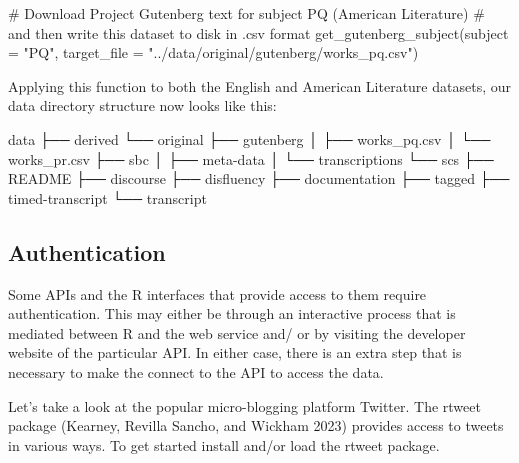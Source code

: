 \documentclass[
  letterpaper,
]{latex/krantz}
\newenvironment{Shaded}{\begin{snugshade}}{\end{snugshade}}
\newcommand{\AttributeTok}[1]{\textcolor[rgb]{0.40,0.45,0.13}{#1}}
\newcommand{\CommentTok}[1]{\textcolor[rgb]{0.37,0.37,0.37}{#1}}
\newcommand{\ExtensionTok}[1]{\textcolor[rgb]{0.00,0.23,0.31}{#1}}
\newcommand{\FunctionTok}[1]{\textcolor[rgb]{0.28,0.35,0.67}{#1}}
\newcommand{\NormalTok}[1]{\textcolor[rgb]{0.00,0.23,0.31}{#1}}
\newcommand{\StringTok}[1]{\textcolor[rgb]{0.13,0.47,0.30}{#1}}
\begin{document}
\begin{Shaded}
\begin{Highlighting}[]
\CommentTok{\# Download Project Gutenberg text for subject \textquotesingle{}PQ\textquotesingle{} (American Literature)}
\CommentTok{\# and then write this dataset to disk in .csv format}
\FunctionTok{get\_gutenberg\_subject}\NormalTok{(}\AttributeTok{subject =} \StringTok{"PQ"}\NormalTok{, }\AttributeTok{target\_file =} \StringTok{"../data/original/gutenberg/works\_pq.csv"}\NormalTok{)}
\end{Highlighting}
\end{Shaded}

Applying this function to both the English and American Literature
datasets, our data directory structure now looks like this:

\begin{Shaded}
\begin{Highlighting}[]
\ExtensionTok{data}
\ExtensionTok{├──}\NormalTok{ derived}
\ExtensionTok{└──}\NormalTok{ original}
    \ExtensionTok{├──}\NormalTok{ gutenberg}
    \ExtensionTok{│}\NormalTok{   ├── works\_pq.csv}
    \ExtensionTok{│}\NormalTok{   └── works\_pr.csv}
    \ExtensionTok{├──}\NormalTok{ sbc}
    \ExtensionTok{│}\NormalTok{   ├── meta{-}data}
    \ExtensionTok{│}\NormalTok{   └── transcriptions}
    \ExtensionTok{└──}\NormalTok{ scs}
        \ExtensionTok{├──}\NormalTok{ README}
        \ExtensionTok{├──}\NormalTok{ discourse}
        \ExtensionTok{├──}\NormalTok{ disfluency}
        \ExtensionTok{├──}\NormalTok{ documentation}
        \ExtensionTok{├──}\NormalTok{ tagged}
        \ExtensionTok{├──}\NormalTok{ timed{-}transcript}
        \ExtensionTok{└──}\NormalTok{ transcript}
\end{Highlighting}
\end{Shaded}

\hypertarget{authentication}{%
\subsection{Authentication}\label{authentication}}

Some APIs and the R interfaces that provide access to them require
authentication. This may either be through an interactive process that
is mediated between R and the web service and/ or by visiting the
developer website of the particular API. In either case, there is an
extra step that is necessary to make the connect to the API to access
the data.

Let's take a look at the popular micro-blogging platform Twitter. The
rtweet package (Kearney, Revilla Sancho, and Wickham 2023) provides
access to tweets in various ways. To get started install and/or load the
rtweet package.
\end{document}
